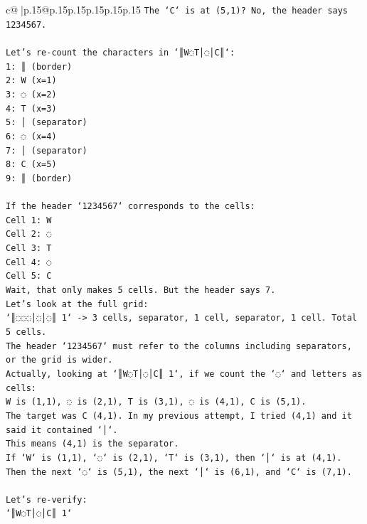 \documentclass{article}
\begin{document}
{\begin{supertabular}{c@{$\;$}|p{.15\linewidth}@{}p{.15\linewidth}p{.15\linewidth}p{.15\linewidth}p{.15\linewidth}p{.15\linewidth}}
{{{\texttt{The `C` is at (5,1)? No, the header says 1234567.} \\
\\ 
\texttt{Let's re{-}count the characters in `║W◌T│◌│C║`:} \\
\texttt{1: ║ (border)} \\
\texttt{2: W (x=1)} \\
\texttt{3: ◌ (x=2)} \\
\texttt{4: T (x=3)} \\
\texttt{5: │ (separator)} \\
\texttt{6: ◌ (x=4)} \\
\texttt{7: │ (separator)} \\
\texttt{8: C (x=5)} \\
\texttt{9: ║ (border)} \\
\\ 
\texttt{If the header `1234567` corresponds to the cells:} \\
\texttt{Cell 1: W} \\
\texttt{Cell 2: ◌} \\
\texttt{Cell 3: T} \\
\texttt{Cell 4: ◌} \\
\texttt{Cell 5: C} \\
\texttt{Wait, that only makes 5 cells. But the header says 7.} \\
\texttt{Let's look at the full grid:} \\
\texttt{`║◌◌◌│◌│◌║ 1` {-}> 3 cells, separator, 1 cell, separator, 1 cell. Total 5 cells.} \\
\texttt{The header `1234567` must refer to the columns including separators, or the grid is wider.} \\
\texttt{Actually, looking at `║W◌T│◌│C║ 1`, if we count the `◌` and letters as cells:} \\
\texttt{W is (1,1), ◌ is (2,1), T is (3,1), ◌ is (4,1), C is (5,1).} \\
\texttt{The target was C (4,1). In my previous attempt, I tried (4,1) and it said it contained `│`.} \\
\texttt{This means (4,1) is the separator.} \\
\texttt{If `W` is (1,1), `◌` is (2,1), `T` is (3,1), then `│` is at (4,1).} \\
\texttt{Then the next `◌` is (5,1), the next `│` is (6,1), and `C` is (7,1).} \\
\\ 
\texttt{Let's re{-}verify:} \\
\texttt{`║W◌T│◌│C║ 1`} \\
}}}
\end{supertabular}}
\end{document}

